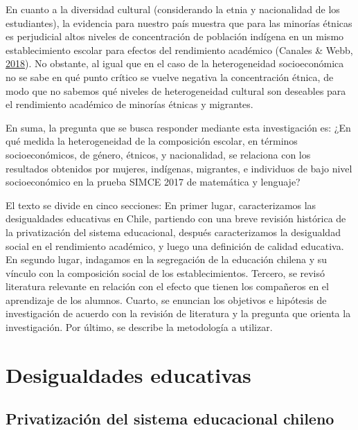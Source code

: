\documentclass[
]{article}
\begin{document}
En cuanto a la diversidad cultural (considerando la etnia y nacionalidad
de los estudiantes), la evidencia para nuestro país muestra que para las
minorías étnicas es perjudicial altos niveles de concentración de
población indígena en un mismo establecimiento escolar para efectos del
rendimiento académico (Canales \& Webb,
\protect\hyperlink{ref-canales_educational_2018}{2018}). No obstante, al
igual que en el caso de la heterogeneidad socioeconómica no se sabe en
qué punto crítico se vuelve negativa la concentración étnica, de modo
que no sabemos qué niveles de heterogeneidad cultural son deseables para
el rendimiento académico de minorías étnicas y migrantes.

En suma, la pregunta que se busca responder mediante esta investigación
es: ¿En qué medida la heterogeneidad de la composición escolar, en
términos socioeconómicos, de género, étnicos, y nacionalidad, se
relaciona con los resultados obtenidos por mujeres, indígenas,
migrantes, e individuos de bajo nivel socioeconómico en la prueba SIMCE
2017 de matemática y lenguaje?

El texto se divide en cinco secciones: En primer lugar, caracterizamos
las desigualdades educativas en Chile, partiendo con una breve revisión
histórica de la privatización del sistema educacional, después
caracterizamos la desigualdad social en el rendimiento académico, y
luego una definición de calidad educativa. En segundo lugar, indagamos
en la segregación de la educación chilena y su vínculo con la
composición social de los establecimientos. Tercero, se revisó
literatura relevante en relación con el efecto que tienen los compañeros
en el aprendizaje de los alumnos. Cuarto, se enuncian los objetivos e
hipótesis de investigación de acuerdo con la revisión de literatura y la
pregunta que orienta la investigación. Por último, se describe la
metodología a utilizar.

\hypertarget{desigualdades-educativas}{%
\section{Desigualdades educativas}\label{desigualdades-educativas}}

\hypertarget{privatizaciuxf3n-del-sistema-educacional-chileno}{%
\subsection{Privatización del sistema educacional
chileno}\label{privatizaciuxf3n-del-sistema-educacional-chileno}}
\end{document}
